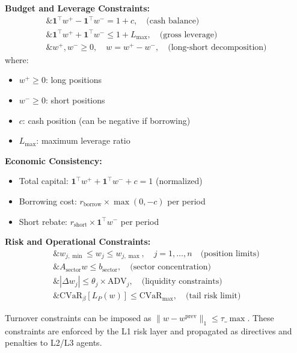\documentclass[11pt]{article}
\begin{document}
\textbf{Budget and Leverage Constraints:}
\begin{equation}
\begin{aligned}
\&\mathbf{1}^\top w^+ - \mathbf{1}^\top w^- = 1 + c, \quad \text{(cash balance)}\\
\&\mathbf{1}^\top w^+ + \mathbf{1}^\top w^- \leq 1 + L_{\max}, \quad \text{(gross leverage)}\\
\&w^+, w^- \geq 0, \quad w = w^+ - w^-, \quad \text{(long-short decomposition)}
\end{aligned}
\end{equation}
where:
\begin{itemize}
\item $w^+ \geq 0$: long positions
\item $w^- \geq 0$: short positions  
\item $c$: cash position (can be negative if borrowing)
\item $L_{\max}$: maximum leverage ratio

\end{itemize}
\textbf{Economic Consistency:}
\begin{itemize}
\item Total capital: $\mathbf{1}^\top w^+ + \mathbf{1}^\top w^- + c = 1$ (normalized)
\item Borrowing cost: $r_{\text{borrow}} \times \max(0, -c)$ per period
\item Short rebate: $r_{\text{short}} \times \mathbf{1}^\top w^-$ per period

\end{itemize}
\textbf{Risk and Operational Constraints:}
\begin{equation}
\begin{aligned}
\&w_{j,\min} \leq w_j \leq w_{j,\max}, \quad j = 1,\ldots,n\quad \text{(position limits)}\\
\&A_{\text{sector}} w \leq b_{\text{sector}}, \quad \text{(sector concentration)}\\
\&|\Delta w_j| \leq \theta_j \times \text{ADV}_j, \quad \text{(liquidity constraints)}\\
\&\text{CVaR}_{\beta}[L_P(w)] \leq \text{CVaR}_{\max}, \quad \text{(tail risk limit)}
\end{aligned}
\end{equation}

Turnover constraints can be imposed as $\|w-w^{\text{prev}}\|_1 \le \tau\_{\max}$. These constraints are enforced by the L1 risk layer and propagated as directives and penalties to L2/L3 agents.
\end{document}
